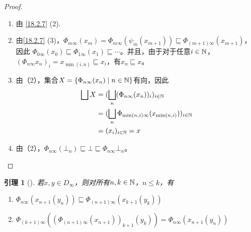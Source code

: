 \documentclass[11pt]{article}
\newtheorem{lemma}[theorem]{引理}
\begin{document}
\begin{proof}
\begin{enumerate}
\item 由 \ref{18.2.7} (2).
\item 由\ref{18.2.7} (3)，\(\Phi_{m\infty}(x_m)=\Phi_{m\infty}(\psi_m(x_{m+1}))\sqsubseteq\Phi_{(m+1)\infty}(x_{m+1})\)，因此
\(\Phi_{0\infty}(x_0)\sqsubseteq\Phi_{1\infty}(x_1)\sqsubseteq\cdots\)。并且，由于对于任意\(i\in\mathbb{N}\)，
\((\Phi_{n\infty}x_n)_i=x_{\min(i,n)}\sqsubseteq x_i\)，有\(x_n\sqsubseteq x\)。
\item 由（2），集合\(X=\{\Phi_{n\infty}(x_n)\mid n\in\mathbb{N}\}\)有向，因此
\begin{align*}
\bigsqcup X&=(\bigsqcup_n(\Phi_{n\infty}(x_n))_i)_{i\in\mathbb{N}}\\
&=(\bigsqcup_n\Phi_{\min(n,i)\infty}(x_{\min(n,i)}))_{i\in\mathbb{N}}\\
&=(x_i)_{i\in\mathbb{N}}=x
\end{align*}
\item 由（2），\(\Phi_{n\infty}(\bot_n)\sqsubseteq\bot\sqsubseteq\Phi_{n\infty}\bot_n\)。
\end{enumerate}
\end{proof}

\begin{lemma}[]
\label{18.2.9}
若\(x,y\in D_\infty\)，则对所有\(n,k\in\mathbb{N}\)，\(n\le k\)，有
\begin{enumerate}
\item \(\Phi_{n\infty}(x_{n+1}(y_n))\sqsubseteq \Phi_{(n+1)\infty}(x_{k+1}(y_k))\)
\item \(\Phi_{(k+1)\infty}((\Phi_{(n+1)\infty}(x_{n+1}))_{k+1}(y_k))=\Phi_{n\infty}(x_{n+1}(y_n))\)
\end{enumerate}
\end{lemma}
\end{document}
